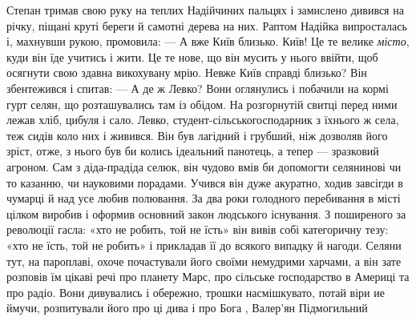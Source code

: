 Степан тримав свою руку на теплих Надійчиних пальцях і замислено дивився на
річку, піщані круті береги й самотні дерева на них. Раптом Надійка випросталась
і, махнувши рукою, промовила: — А вже Київ близько.  Київ! Це те велике \emph{місто},
куди він їде учитись і жити. Це те нове, що він мусить у нього ввійти, щоб
осягнути свою здавна викохувану мрію. Невже Київ справді близько? Він
збентежився і спитав: — А де ж Левко?  Вони оглянулись і побачили на кормі гурт
селян, що розташувались там із обідом.  На розгорнутій свитці перед ними лежав
хліб, цибуля і сало. Левко, студент-сільськогосподарник з їхнього ж села, теж
сидів коло них і живився. Він був лагідний і грубший, ніж дозволяв його зріст,
отже, з нього був би колись ідеальний панотець, а тепер — зразковий агроном.
Сам з діда-прадіда селюк, він чудово вмів би допомогти селянинові чи то
казанню, чи науковими порадами.  Учився він дуже акуратно, ходив завсігди в
чумарці й над усе любив полювання.  За два роки голодного перебивання в місті
цілком виробив і оформив основний закон людського існування. З поширеного за
революції гасла: «хто не робить, той не їсть» він вивів собі категоричну тезу:
«хто не їсть, той не робить» і прикладав її до всякого випадку й нагоди. Селяни
тут, на пароплаві, охоче почастували його своїми немудрими харчами, а він зате
розповів їм цікаві речі про планету Марс, про сільське господарство в Америці
та про радіо. Вони дивувались і обережно, трошки насмішкувато, потай віри ие
ймучи, розпитували його про ці дива і про Бога
, Валер'ян Підмогильний
